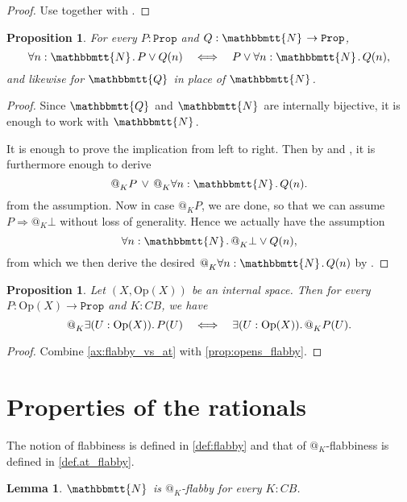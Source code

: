 \documentclass[11pt, oneside, article]{memoir}
\makeatletter
\theoremstyle{plain}
\newtheorem{proposition}[theorem]{Proposition}
\newtheorem{lemma}[theorem]{Lemma}
\theoremstyle{definition}
\theoremstyle{remark}
\newcommand{\const}[1]{\mathtt{#1}}
\newcommand{\Set}[1]{\mathrm{#1}}
\newcommand{\internal}[1]{\raisebox{-.03ex}{$\mathbbmtt{#1}$}}
\newcommand{\hs}{\hspace{1.1pt}}
\newcommand{\tNN}{\internal{N}\hs}
\newcommand{\tQQ}{\internal{Q}\hs}
\newcommand{\Prop}{\const{Prop}}
\newcommand{\Op}{\Set{Op}}
\newcommand{\BaseSpace}{B}
\newcommand{\CB}{C\BaseSpace}
\newcommand{\AtSymbol}{{@}}
\newcommand{\At}[2][]{\AtSymbol^{#1}_{#2}}
\newcommand{\imp}{\Rightarrow}
\makeatother
\begin{document}
\begin{proof}
	Use  together with .
\end{proof}

\begin{proposition}
	\label{prop.N_or_vs_forall}
	For every $P : \Prop$ and $Q : \tNN \to \Prop$,
	\[
		\forall n : \tNN\ldotp P \lor Q(n) \quad \Longleftrightarrow \quad P \lor \forall n : \tNN \ldotp Q(n),
	\]
	and likewise for $\tQQ$ in place of $\tNN$.
\end{proposition}

\begin{proof}
	Since $\tQQ$ and $\tNN$ are internally bijective, it is enough to work with $\tNN$.

	It is enough to prove the implication from left to right. Then by  and , it is furthermore enough to derive
	\[
		\At{K} P \, \lor \, \At{K} \forall n : \tNN \ldotp Q(n).
	\]
	from the assumption. Now in case $\At{K} P$, we are done, so that we can assume $P \imp \At{K} \bot$ without loss of generality. Hence we actually have the assumption
	\[
		\forall n : \tNN \ldotp \At{K} \bot \lor Q(n),
	\]
	from which we then derive the desired $\At{K} \forall n : \tNN \ldotp Q(n)$ by .
\end{proof}

\begin{proposition}
	Let $(X,\Op(X))$ be an internal space. Then for every $P : \Op(X)\to \Prop$ and $K : \CB$, we have
	\[
		\At{K} \exists (U : \Op(X))\ldotp P(U) \quad \Longleftrightarrow \quad \exists (U : \Op(X))\ldotp \At{K} P(U).
	\]
\end{proposition}

\begin{proof}
	Combine \cref{ax:flabby_vs_at} with \cref{prop:opens_flabby}.	
\end{proof}

\section{Properties of the rationals}

The notion of flabbiness is defined in \cref{def:flabby} and that of $\At{K}$-flabbiness is defined in \cref{def.at_flabby}.

\begin{lemma}
	$\tNN$ is $\At{K}$-flabby for every $K : \CB$.
	\label{lem:N_flabby}
\end{lemma}
\end{document}
